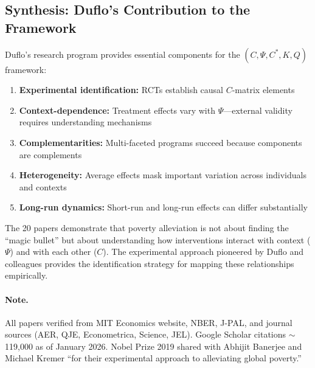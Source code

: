 \subsection{Synthesis: Duflo's Contribution to the Framework}

Duflo's research program provides essential components for the $(C, \Psi, C^*, K, Q)$ framework:
\begin{enumerate}
  \item \textbf{Experimental identification:} RCTs establish causal $C$-matrix elements
  \item \textbf{Context-dependence:} Treatment effects vary with $\Psi$---external validity requires
        understanding mechanisms
  \item \textbf{Complementarities:} Multi-faceted programs succeed because components are complements
  \item \textbf{Heterogeneity:} Average effects mask important variation across individuals and contexts
  \item \textbf{Long-run dynamics:} Short-run and long-run effects can differ substantially
\end{enumerate}

The 20 papers demonstrate that poverty alleviation is not about finding the ``magic
bullet'' but about understanding how interventions interact with context ($\Psi$) and with
each other ($C$). The experimental approach pioneered by Duflo and colleagues provides
the identification strategy for mapping these relationships empirically.

\paragraph{Note.} 
All papers verified from MIT Economics website, NBER, J-PAL, and journal
sources (AER, QJE, Econometrica, Science, JEL). Google Scholar citations $\sim$119,000
as of January 2026. Nobel Prize 2019 shared with Abhijit Banerjee and Michael Kremer
``for their experimental approach to alleviating global poverty.''


